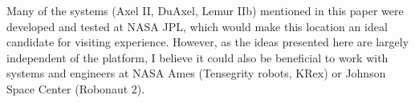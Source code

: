 \documentclass[12pt]{article}
\begin{document}
Many of the systems (Axel II, DuAxel, Lemur IIb) mentioned in this paper were developed and tested at NASA 
JPL, which would make this location an ideal candidate for visiting experience. However, as the ideas presented here 
are largely independent of the platform, I believe it could also be beneficial to work with systems and 
engineers at NASA Ames (Tensegrity robots, KRex) or Johnson Space Center (Robonaut 2).



\newpage

\small{}

\end{document}
